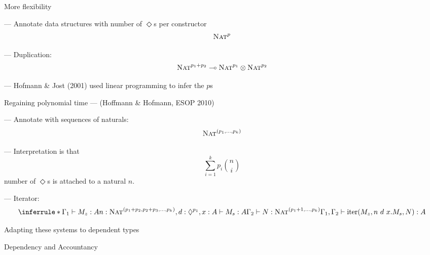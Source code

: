 \documentclass[xetex,serif,mathserif,aspectratio=169]{beamer}
\newcommand{\youtem}{\quad \textcolor{titlered!80}{---} \quad}
\newcommand{\titlecard}[1]{\begin{frame}%
  \begin{center}%
    \Large \textcolor{titlered}{#1}%
  \end{center}%
\end{frame}}
\newcommand{\HEAD}[1]{\textcolor{titlered}{#1}}
\begin{document}
\begin{frame}
  \HEAD{More flexibility}

  \bigskip

  \youtem Annotate data structures with number of $\Diamond$s per constructor
  \begin{displaymath}
    \textsc{Nat}^p
  \end{displaymath}

  \smallskip

  \youtem Duplication:
  \begin{displaymath}
    \textsc{Nat}^{p_1+p_2} \multimap \textsc{Nat}^{p_1} \otimes \textsc{Nat}^{p_2}
  \end{displaymath}

  \smallskip

  \youtem Hofmann \& Jost (2001) used linear programming to infer the $p$s
\end{frame}

\begin{frame}
  \HEAD{Regaining polynomial time} ---
  \quad \qquad \textcolor{black!60}{(Hoffmann \& Hofmann, ESOP 2010)}

  \bigskip

  \youtem Annotate with sequences of naturals:
  \begin{displaymath}
    \textsc{Nat}^{(p_1, \dots, p_k)}
  \end{displaymath}

  \youtem Interpretation is that
  \begin{displaymath}
    \sum_{i=1}^kp_i{n \choose i}
  \end{displaymath}
  \qquad \quad number of $\Diamond$s is attached to a natural $n$.

  \pause
  \medskip

  \youtem Iterator:
  \begin{displaymath}
    \inferrule*
    {\Gamma_1 \vdash M_z : A \\
      n : \TyNat^{(p_1+p_2,p_2+p_3,\dots,p_k)}, d : \Diamond^{p_1}, x : A \vdash M_s : A \\
      \Gamma_2 \vdash N : \TyNat^{(p_1+1,\dots,p_k)}}
    {\Gamma_1, \Gamma_2 \vdash \mathrm{iter}(M_z, n~d~x.M_s,N) : A}
  \end{displaymath}
\end{frame}

\titlecard{Adapting these systems to dependent types}

\titlecard{Dependency and Accountancy}
\end{document}
